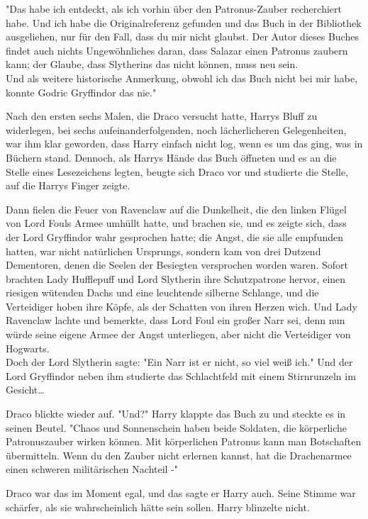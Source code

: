 {"Das habe ich entdeckt, als ich vorhin über den Patronus-Zauber recherchiert habe. Und ich habe die Originalreferenz gefunden und das Buch in der Bibliothek ausgeliehen, nur für den Fall, dass du mir nicht glaubst. Der Autor dieses Buches findet auch nichts Ungewöhnliches daran, dass Salazar einen Patronus zaubern kann; der Glaube, dass Slytherins das nicht können, muss neu sein.\\ Und als weitere historische Anmerkung, obwohl ich das Buch nicht bei mir habe, konnte Godric Gryffindor das nie."

Nach den ersten sechs Malen, die Draco versucht hatte, Harrys Bluff zu widerlegen, bei sechs aufeinanderfolgenden, noch lächerlicheren Gelegenheiten, war ihm klar geworden, dass Harry einfach nicht log, wenn es um das ging, was in Büchern stand. Dennoch, als Harrys Hände das Buch öffneten und es an die Stelle eines Lesezeichens legten, beugte sich Draco vor und studierte die Stelle, auf die Harrys Finger zeigte.

Dann fielen die Feuer von Ravenclaw auf die Dunkelheit, die den linken Flügel von Lord Fouls Armee umhüllt hatte, und brachen sie, und es zeigte sich, dass der Lord Gryffindor wahr gesprochen hatte; die Angst, die sie alle empfunden hatten, war nicht natürlichen Ursprungs, sondern kam von drei Dutzend Dementoren, denen die Seelen der Besiegten versprochen worden waren. Sofort brachten Lady Hufflepuff und Lord Slytherin ihre Schutzpatrone hervor, einen riesigen wütenden Dachs und eine leuchtende silberne Schlange, und die Verteidiger hoben ihre Köpfe, als der Schatten von ihren Herzen wich. Und Lady Ravenclaw lachte und bemerkte, dass Lord Foul ein großer Narr sei, denn nun würde seine eigene Armee der Angst unterliegen, aber nicht die Verteidiger von Hogwarts.\\ Doch der Lord Slytherin sagte: "Ein Narr ist er nicht, so viel weiß ich." Und der Lord Gryffindor neben ihm studierte das Schlachtfeld mit einem Stirnrunzeln im Gesicht…

Draco blickte wieder auf. "Und?" Harry klappte das Buch zu und steckte es in seinen Beutel. "Chaos und Sonnenschein haben beide Soldaten, die körperliche Patronuszauber wirken können. Mit körperlichen Patronus kann man Botschaften übermitteln. Wenn du den Zauber nicht erlernen kannst, hat die Drachenarmee einen schweren militärischen Nachteil -"

Draco war das im Moment egal, und das sagte er Harry auch. Seine Stimme war schärfer, als sie wahrscheinlich hätte sein sollen. Harry blinzelte nicht.

}
